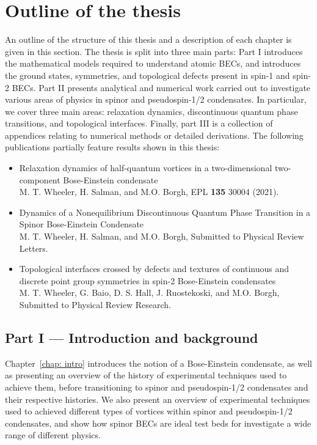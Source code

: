 \section{Outline of the thesis}
An outline of the structure of this thesis and a description of each chapter is
given in this section.
The thesis is split into three main parts: Part I introduces the mathematical
models required to understand atomic BECs, and introduces the ground states,
symmetries, and topological defects present in spin-1 and spin-2 BECs.
Part II presents analytical and numerical work carried out to investigate
various areas of physics in spinor and pseudospin-1/2 condensates.
In particular, we cover three main areas: relaxation dynamics, discontinuous
quantum phase transitions, and topological interfaces.
Finally, part III is a collection of appendices relating to numerical methods
or detailed derivations.
The following publications partially feature results shown in this thesis:
\begin{itemize}
    \item Relaxation dynamics of half-quantum vortices in a two-dimensional
          two-component Bose-Einstein condensate\\
          {\small M. T. Wheeler, H. Salman, and M.O. Borgh, EPL \textbf{135}
          30004 (2021).}
    \item Dynamics of a Nonequilibrium  Discontinuous Quantum Phase Transition
            in a Spinor Bose-Einstein Condensate\\
          {\small M. T. Wheeler, H. Salman, and M.O. Borgh, Submitted to
          Physical Review Letters.}
    \item Topological interfaces crossed by defects and textures of continuous
            and discrete point group symmetries in spin-2 Bose-Einstein
            condensates\\
          {\small M. T. Wheeler, G. Baio, D. S. Hall, J. Ruostekoski, and M.O.
          Borgh, Submitted to Physical Review Research.}
\end{itemize}

\subsection*{Part I --- Introduction and background}
Chapter~\ref{chap: intro} introduces the notion of a Bose-Einstein condensate, as well as
presenting an overview of the history of experimental techniques used to achieve
them, before transitioning to spinor and pseudospin-1/2 condensates and their
respective histories.
We also present an overview of experimental techniques used to achieved
different types of vortices within spinor and pseudospin-1/2 condensates, and
show how spinor BECs are ideal test beds for investigate a wide range of
different physics.

